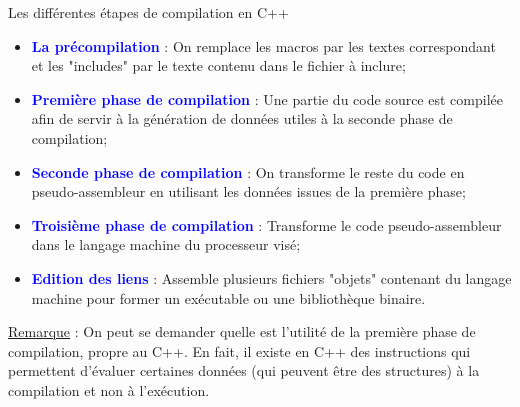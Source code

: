 \documentclass[compress,10pt,aspectratio=169]{beamer}
\begin{document}
\begin{frame}{Les différentes étapes de compilation en C++}
    \scriptsize 
    \begin{itemize}
        \item \textbf{\textcolor{blue}{La précompilation}} : On remplace les macros par les textes correspondant et les "includes" par le texte contenu dans le fichier à inclure;
        \item \textbf{\textcolor{blue}{Première phase de compilation}} : Une partie du code source est compilée afin de servir à la génération de données utiles à la seconde phase de compilation;
        \item \textbf{\textcolor{blue}{Seconde phase de compilation}} : On transforme le reste du code en pseudo-assembleur en utilisant les données issues de la première phase;
        \item \textbf{\textcolor{blue}{Troisième phase de compilation}} : Transforme le code pseudo-assembleur dans le langage machine du processeur visé;
        \item \textbf{\textcolor{blue}{Edition des liens}} : Assemble plusieurs fichiers "objets" contenant du langage machine pour former un exécutable ou une bibliothèque binaire.
    \end{itemize}

    \underline{Remarque} : On peut se demander quelle est l'utilité de la première phase de compilation, propre au C++. En fait, il existe en 
    C++ des instructions qui permettent d'évaluer certaines données (qui peuvent être des structures) à la compilation et non à l'exécution.
\end{frame}
\end{document}
